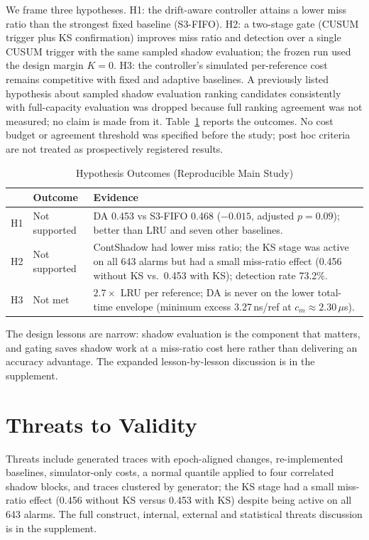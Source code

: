 \documentclass[10pt,twocolumn,a4paper]{IEEEtran}
\begin{document}
We frame three hypotheses. H1: the drift-aware controller attains a lower miss
ratio than the strongest fixed baseline (S3-FIFO). H2: a two-stage gate (CUSUM
trigger plus KS confirmation) improves miss ratio and detection over a single
CUSUM trigger with the same sampled shadow evaluation; the frozen run used the
design margin $K = 0$. H3: the controller's simulated per-reference cost remains
competitive with fixed and adaptive baselines. A previously listed hypothesis
about sampled shadow evaluation ranking candidates consistently with
full-capacity evaluation was dropped because full ranking agreement was not
measured; no claim is made from it.
Table~\ref{tab:hypotheses} reports the outcomes. No cost budget or agreement
threshold was specified before the study; post hoc criteria are not treated as
prospectively registered results.

\begin{table}[!t]
\caption{Hypothesis Outcomes (Reproducible Main Study)}
\label{tab:hypotheses}
\footnotesize
\begin{tabular}{@{}p{}p{}p{}@{}}
\toprule
 & Outcome & Evidence \\
\midrule
H1 & Not supported & DA 0.453 vs S3-FIFO 0.468 ($-0.015$, adjusted $p = 0.09$); better than LRU and seven other baselines. \\
H2 & Not supported & ContShadow had lower miss ratio; the KS stage was active on all 643 alarms but had a small miss-ratio effect (0.456 without KS vs.\ 0.453 with KS); detection rate 73.2\%. \\
H3 & Not met & $2.7\times$ LRU per reference; DA is never on the lower total-time envelope (minimum excess 3.27\,ns/ref at $c_m\approx2.30\,\mu$s). \\
\bottomrule
\end{tabular}
\end{table}

The design lessons are narrow: shadow evaluation is the component that
matters, and gating saves shadow work at a miss-ratio cost here rather than
delivering an accuracy advantage. The expanded lesson-by-lesson discussion is
in the supplement.

\section{Threats to Validity}
\label{sec:threats}

Threats include generated traces with epoch-aligned changes, re-implemented
baselines, simulator-only costs, a normal quantile applied to four correlated
shadow blocks, and traces clustered by generator; the KS stage had a small
miss-ratio effect (0.456 without KS versus 0.453 with KS) despite being active
on all 643 alarms. The full construct, internal, external and statistical
threats discussion is in the supplement.
\end{document}
